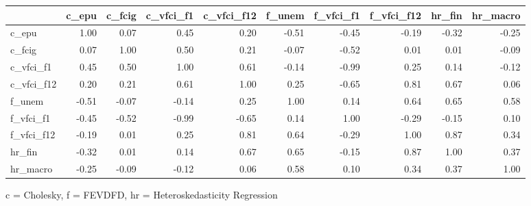 

\begin{tabular*}{\linewidth}{@{\extracolsep{\fill}}l|rrrrrrrrr}
\toprule
 & c\_epu & c\_fcig & c\_vfci\_f1 & c\_vfci\_f12 & f\_unem & f\_vfci\_f1 & f\_vfci\_f12 & hr\_fin & hr\_macro \\ 
\midrule\addlinespace[2.5pt]
c\_epu & 1.00 & 0.07 & 0.45 & 0.20 & -0.51 & -0.45 & -0.19 & -0.32 & -0.25 \\ 
c\_fcig & 0.07 & 1.00 & 0.50 & 0.21 & -0.07 & -0.52 & 0.01 & 0.01 & -0.09 \\ 
c\_vfci\_f1 & 0.45 & 0.50 & 1.00 & 0.61 & -0.14 & -0.99 & 0.25 & 0.14 & -0.12 \\ 
c\_vfci\_f12 & 0.20 & 0.21 & 0.61 & 1.00 & 0.25 & -0.65 & 0.81 & 0.67 & 0.06 \\ 
f\_unem & -0.51 & -0.07 & -0.14 & 0.25 & 1.00 & 0.14 & 0.64 & 0.65 & 0.58 \\ 
f\_vfci\_f1 & -0.45 & -0.52 & -0.99 & -0.65 & 0.14 & 1.00 & -0.29 & -0.15 & 0.10 \\ 
f\_vfci\_f12 & -0.19 & 0.01 & 0.25 & 0.81 & 0.64 & -0.29 & 1.00 & 0.87 & 0.34 \\ 
hr\_fin & -0.32 & 0.01 & 0.14 & 0.67 & 0.65 & -0.15 & 0.87 & 1.00 & 0.37 \\ 
hr\_macro & -0.25 & -0.09 & -0.12 & 0.06 & 0.58 & 0.10 & 0.34 & 0.37 & 1.00 \\ 
\bottomrule
\end{tabular*}
\begin{minipage}{\linewidth}
c = Cholesky, f = FEVDFD, hr = Heteroskedasticity Regression\\
\end{minipage}



